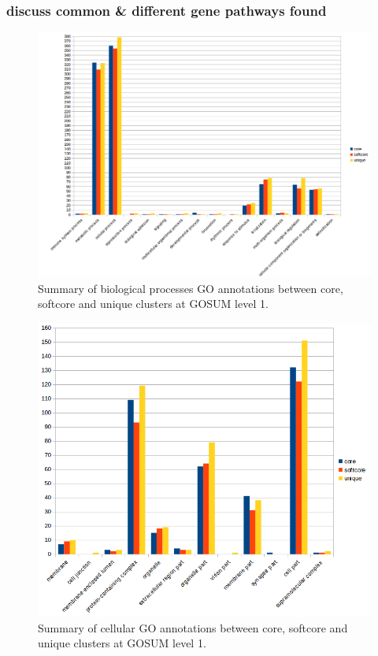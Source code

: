 \documentclass[12pt]{article}
\begin{document}
\subsubsection*{discuss common \& different gene pathways found}

\begin{figure} 
\includegraphics[scale=.6]{3Aug18_cluster-investigation/figures/Gambi-gosum1-bio-graph.png} 
\caption{Summary of biological processes GO annotations between core, softcore and unique clusters at GOSUM level 1.} 
\label{fig:}
\end{figure} 
\FloatBarrier

\begin{figure} 
\includegraphics[scale=.8]{3Aug18_cluster-investigation/figures/Gambi-gosum1-cell-graph.png} 
\caption{Summary of cellular GO annotations between core, softcore and unique clusters at GOSUM level 1.} 
\label{fig:}
\end{figure} 
\FloatBarrier
\end{document}
